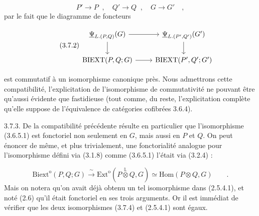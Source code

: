\begin{equation}\tag{3.7.1}
P' \longrightarrow P \;\; , \quad Q' \longrightarrow Q \;\; , \quad G \longrightarrow G' \quad ,
\end{equation}
par le fait que le diagramme de foncteurs

\begin{equation}\tag{3.7.2}
\begin{tikzcd}
\underline{\Psi}_{L.(P,Q)}(G) \arrow[r] \arrow[d] & \underline{\Psi}_{L.(P',Q')}(G') \arrow[d] \\
\mathrm{BIEXT}(P,Q;G) \arrow[r] & \mathrm{BIEXT}(P',Q';G')
\end{tikzcd}
\end{equation}

est commutatif à un isomorphisme canonique près. Nous admettrons cette compatibilité, l'explicitation de l'isomorphisme de commutativité ne pouvant être qu'aussi évidente que fastidieuse (tout comme, du reste, l'explicitation complète qu'elle suppose de l'équivalence de catégories cofibrées 3.6.4).

3.7.3. De la compatibilité précédente résulte en particulier que l'isomorphisme (3.6.5.1) est fonctoriel non seulement en $G$, mais aussi en $P$ et $Q$. On peut énoncer de même, et plus trivialement, une fonctorialité analogue pour l'isomorphisme défini via (3.1.8) comme (3.6.5.1) l'était via (3.2.4) :

\begin{equation}\tag{3.7.4}
\mathrm{Biext}^{\mathrm{o}}(P,Q;G) \xrightarrow{\ \sim\ } \mathrm{Ext}^{\mathrm{o}}(P \overset{\mathbb{L}}{\otimes} Q,G) \simeq \mathrm{Hom}(P \otimes Q,G) \qquad .
\end{equation}
Mais on notera qu'on avait déjà obtenu un tel isomorphisme dans (2.5.4.1), et noté (2.6) qu'il était fonctoriel en ses trois arguments. Or il est immédiat de vérifier que les deux isomorphismes (3.7.4) et (2.5.4.1) sont égaux.

